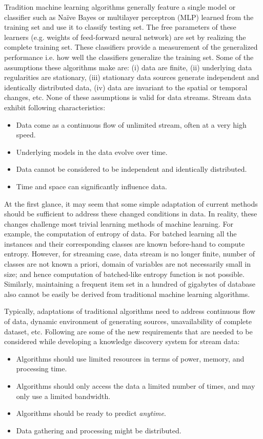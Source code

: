Tradition machine learning algorithms generally feature a single model or classifier such as Na\"ive Bayes or multilayer perceptron (MLP) learned from the training set and use it to classify testing set. The free parameters of these learners (e.g. weights of feed-forward neural network) are set by realizing the complete training set. These classifiers provide a measurement of the generalized performance i.e. how well the classifiers generalize the training set. Some of the assumptions these algorithms make are: (i) data are finite, (ii) underlying data regularities are stationary, (iii) stationary data sources generate independent and identically distributed data, (iv) data are invariant to the spatial or temporal changes, etc. None of these assumptions is valid for data streams. Stream data exhibit following characteristics: 
\begin{itemize}
    \item Data come as a continuous flow of unlimited stream, often at a very high speed.
    \item Underlying models in the data evolve over time.
    \item Data cannot be considered to be independent and identically distributed.
    \item Time and space can significantly influence data.
\end{itemize}
At the first glance, it may seem that some simple adaptation of current methods should be sufficient to address these changed conditions in data. In reality, these changes challenge most trivial learning methods of machine learning. For example, the computation of entropy of data. For batched learning all the instances and their corresponding classes are known before-hand to compute entropy. However, for streaming case, data stream is no longer finite, number of classes are not known a priori, domain of variables are not necessarily small in size; and hence computation of batched-like entropy function is not possible. Similarly, maintaining a frequent item set in a hundred of gigabytes of database also cannot be easily be derived from traditional machine learning algorithms.

Typically, adaptations of traditional algorithms need to address continuous flow of data, dynamic environment of generating sources, unavailability of complete dataset, etc. Following are some of the new requirements that are needed to be considered while developing a knowledge discovery system for stream data:
\begin{itemize}
    \item Algorithms should use limited resources in terms of power, memory, and processing time.
    \item Algorithms should only access the data a limited number of times, and may only use a limited bandwidth.
    \item Algorithms should be ready to predict {\it anytime}. 
    \item Data gathering and processing might be distributed.
\end{itemize}

